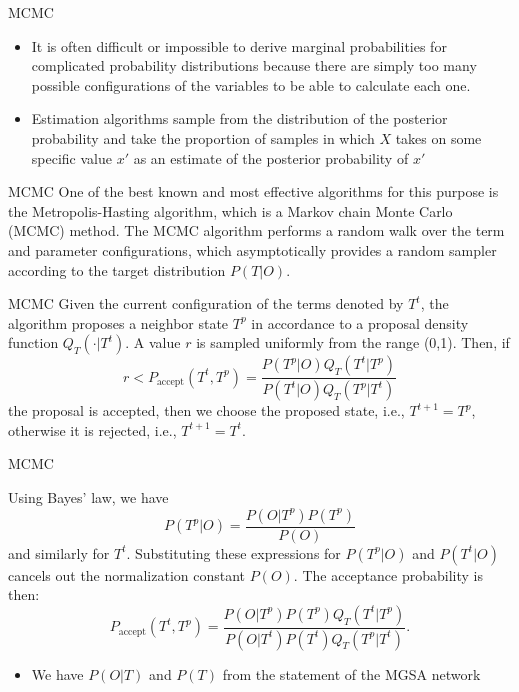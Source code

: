 \documentclass{beamer}
\begin{document}
\begin{frame}{MCMC}
 \begin{itemize}
  \item It is often difficult or
impossible to derive marginal probabilities for complicated
probability distributions because there are simply too many possible
configurations of the variables to be able to calculate each one. 
\item Estimation algorithms sample from the distribution of the posterior probability and take the
proportion of samples in which $X$ takes on some specific value
$x'$ as an estimate of the posterior probability of $x'$  
 \end{itemize}
\begin{mybluebox}{MCMC}
 One of the best known and most effective algorithms for this purpose
is the Metropolis-Hasting algorithm, which is a Markov chain Monte
Carlo (MCMC) method. The
MCMC algorithm performs a random walk over the term and parameter
configurations, which asymptotically provides a random sampler
according to the target distribution $P(T|O)$.
\end{mybluebox}
\end{frame}
\begin{frame}{MCMC}
 Given the current configuration of the terms denoted by $T^t$, the algorithm
proposes a neighbor state $T^p$ in accordance to a proposal density function
$Q_T(\cdot|T^t)$. A value $r$ is sampled uniformly from the range (0,1). Then,
if
\begin{equation}
 r < P_{\text{accept}}(T^t,T^p) = 
 \frac{P(T^{p}|O)Q_T(T^{t}|T^{p})}{P(T^{t}|O)Q_T(T^{p}|T^t)}
 \label{eqn:acceptance}
\end{equation}
the proposal is accepted, then we choose the proposed state, i.e., $T^{t+1} = T^p$, otherwise it is rejected,
i.e., $T^{t+1} = T^t$.
\end{frame}
\begin{frame}{MCMC}
 
 Using Bayes' law, we have
\begin{equation}
 P(T^{p}|O) = \dfrac{P(O|T^{p})P(T^{p})}{P(O)}
 \label{eqn:cond.prob}
\end{equation}
and similarly for $T^{t}$. Substituting these expressions for $P(T^{p}|O)$ and
$P(T^{t}|O)$ cancels out the normalization constant $P(O)$. The acceptance
probability is then:
\begin{equation}
 P_{\text{accept}}(T^t,T^p) = 
 \frac{P(O|T^{p})P(T^{p})Q_T(T^{t}|T^{p})}{P(O|T^{t})P(T^{t})Q_T(T^{p}|T^t)}.
\label{eqn:accept.prop.2}
\end{equation}
 \begin{itemize}
  \item We have $P(O|T)$ and $P(T)$ from the statement of the MGSA network
 \end{itemize}

\end{frame}
\end{document}
